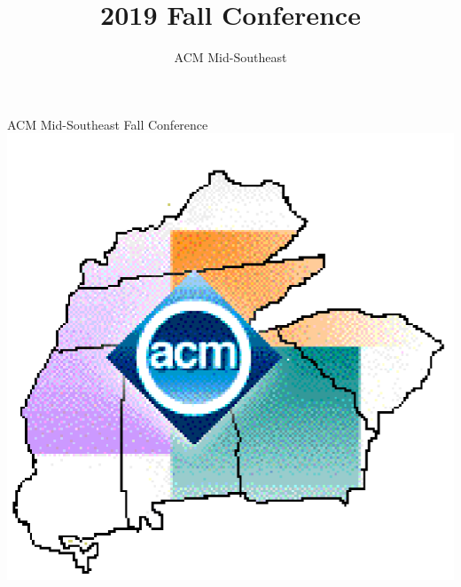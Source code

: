 \documentclass[handout]{beamer}
\title{2019 Fall Conference}
\author{ACM Mid-Southeast}
\date[]{}
\begin{document}
\begin{frame}
  \begin{center}
    {\color{acmblue}\Huge ACM Mid-Southeast
        \vspace{0.5cm}
         Fall Conference} 
    \newline\includegraphics[height=0.5\textheight]{colorlogo}
  \end{center}
\end{frame}




\end{document}
